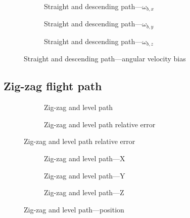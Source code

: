 \begin{figure}[H]
    \centering
    \begin{subfigure}{0.3\textwidth}
        
        \caption{Straight and descending path---$\omega_{b,x}$}
    \end{subfigure}
    \hfill
    \begin{subfigure}{0.3\textwidth}
        
        \caption{Straight and descending path---$\omega_{b,y}$}
    \end{subfigure}
    \hfill
    \begin{subfigure}{0.3\textwidth}
        
        \caption{Straight and descending path---$\omega_{b,z}$}
    \end{subfigure}
    \caption{Straight and descending path---angular velocity bias}\label{fig:straight-descending-wbias}
\end{figure}


\subsection{Zig-zag flight path}

\begin{figure}[H]
    \centering
    \begin{subfigure}{0.45\textwidth}
        
        \caption{Zig-zag and level path}\label{fig:zig-zag-level}
    \end{subfigure}
    \begin{subfigure}{0.45\textwidth}
        
        \caption{Zig-zag and level path relative error}\label{fig:zig-zag-level-error}
    \end{subfigure}
\end{figure}

\begin{figure}[H]
    \centering
    \begin{subfigure}{0.3\textwidth}
        
        \caption{Zig-zag and level path---X}
    \end{subfigure}
    \hfill
    \begin{subfigure}{0.3\textwidth}
        
        \caption{Zig-zag and level path---Y}
    \end{subfigure}
    \hfill
    \begin{subfigure}{0.3\textwidth}
        
        \caption{Zig-zag and level path---Z}
    \end{subfigure}
    \caption{Zig-zag and level path---position}\label{fig:zig-zag-level-pos}
\end{figure}

